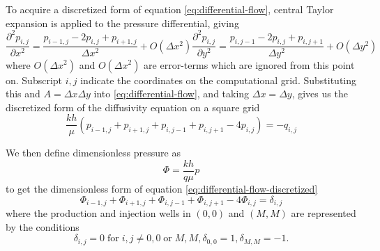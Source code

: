 To acquire a discretized form of equation \eqref{eq:differential-flow}, central Taylor expansion is applied to the pressure differential, giving
\begin{subequations}
    \begin{equation}
        \frac{\partial^2 p_{i,j}}{\partial x^2} = \frac{p_{i-1,j} -2p_{i,j} + p_{i+1,j}}{\Delta x^2} + O(\Delta x^2)
    \end{equation}
    \begin{equation}
        \frac{\partial^2 p_{i,j}}{\partial y^2} = \frac{p_{i,j-1} -2p_{i,j} + p_{i,j+1}}{\Delta y^2} + O(\Delta y^2)
    \end{equation}
\end{subequations}
where $O(\Delta x^2)$ and $O(\Delta x^2)$ are error-terms which are ignored from this point on. Subscript $i,j$ indicate the coordinates on the computational grid. Substituting this and $A=\Delta x \Delta y$ into \eqref{eq:differential-flow}, and taking $\Delta x = \Delta y$, gives us the discretized form of the diffusivity equation on a square grid
\begin{equation}
    \label{eq:differential-flow-discretized}
    \frac{kh}{\mu} \left( p_{i-1,j} + p_{i+1,j} + p_{i,j-1} + p_{i,j+1} -4p_{i,j} \right) = -q_{i,j}
\end{equation}

We then define dimensionless pressure as
\begin{equation}
    \label{eq:dimensionless-pressure}
    \Phi = \frac{kh}{q\mu} p
\end{equation}
to get the dimensionless form of equation \eqref{eq:differential-flow-discretized} \cite{Peaceman1978Interpretation}
\begin{equation}
    \label{eq:differential-flow-discretzed-dimensionless}
     \Phi_{i-1,j} + \Phi_{i+1,j} + \Phi_{i,j-1}  + \Phi_{i,j+1} -4 \Phi_{i,j}  = \delta_{i,j}
\end{equation}
where the production and injection wells in $(0,0)$ and $(M,M)$ are represented by the conditions
\begin{subequations}
    \label{eq:well-conditions}
    \begin{equation}
        \delta_{i,j} = 0 \;\mathrm{for}\; i,j \neq 0,0 \;\mathrm{or}\; M,M,
    \end{equation}    
    \begin{equation}
        \delta_{0,0} = 1,
    \end{equation}
    \begin{equation}
        \delta_{M,M} = -1.
    \end{equation}
\end{subequations}

